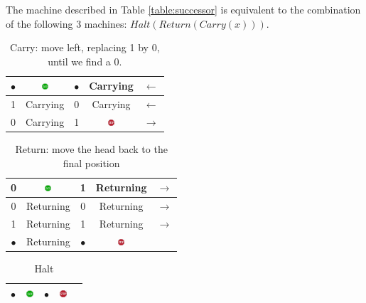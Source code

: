 \documentclass[]{article}
\begin{document}
The machine described in Table \ref{table:successor} is equivalent to the combination of the following 3 machines: $Halt(Return(Carry(x)))$.

\begin{table}[H]
	\begin{center}
		\caption{Carry: move left, replacing 1 by 0, until we find a  0.}\label{table:carry}
		\begin{tabular}{|c|c||c|c|c|} \hline
			$\bullet$ &\includegraphics[width=9pt,height=7pt]{gosign}&$\bullet$ &Carrying&$\leftarrow$ \\ \hline
			1&Carrying&0&Carrying&$\leftarrow$ \\ \hline
			0&Carrying&1&\includegraphics[width=9pt,height=7pt]{stop}&$\rightarrow$ \\ \hline
		\end{tabular}
	\end{center}
\end{table}

\begin{table}[H]
	\begin{center}
		\caption{Return: move the head back to the final position}\label{table:return}
		\begin{tabular}{|c|c||c|c|c|} \hline
			0&\includegraphics[width=9pt,height=7pt]{gosign}&1&Returning&$\rightarrow$ \\ \hline
			0&Returning&0&Returning&$\rightarrow$ \\ \hline
			1&Returning&1&Returning&$\rightarrow$ \\ \hline
			$\bullet$ &Returning&	$\bullet$&\includegraphics[width=9pt,height=7pt]{stop}& \\ \hline
		\end{tabular}
	\end{center}
\end{table}

\begin{table}[H]
	\begin{center}
		\caption{Halt}\label{table:halt}
		\begin{tabular}{|c|c||c|c|c|} \hline
			$\bullet$ &\includegraphics[width=9pt,height=7pt]{gosign}&$\bullet$ &\includegraphics[width=9pt,height=7pt]{stop}& \\ \hline
		\end{tabular}
	\end{center}
\end{table}



\raggedright
{}

\end{document}
